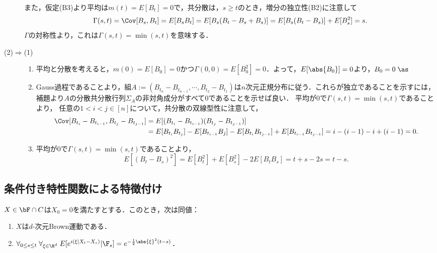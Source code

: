 \documentclass[uplatex,dvipdfmx]{jsreport}
\begin{document}
\begin{Proof}
\begin{description}
        また，仮定(B3)より平均は$m(t)=E[B_t]=0$で，共分散は，$s\ge t$のとき，増分の独立性(B2)に注意して
        \[\Gamma(s,t)=\Cov[B_s,B_t]=E[B_sB_t]=E[B_s(B_t-B_s+B_s)]=E[B_s(B_t-B_s)]+E[B_s^2]=s.\]
        $\Gamma$の対称性より，これは$\Gamma(s,t)=\min(s,t)$を意味する．
        \item[(2)$\Rightarrow$(1)]
        \begin{enumerate}[({B}1)]
            \item 平均と分散を考えると，$m(0)=E[B_0]=0$かつ$\Gamma(0,0)=E[B_0^2]=0$．よって，$E[\abs{B_0}]=0$より，$B_0=0\;\as$
            \item Gauss過程であることより，組$A:=(B_{t_n}-B_{t_{n-1}},\cdots,B_{t_2}-B_{t_1})$は$n$次元正規分布に従う．これらが独立であることを示すには，補題より$A$の分散共分散行列$\Sigma_A$の非対角成分がすべて$0$であることを示せば良い．
            平均が$0$で$\Gamma(s,t)=\min(s,t)$であることより，
            任意の$1<i< j\in[n]$について，共分散の双線型性に注意して，
            \begin{align*}
                \Cov[B_{t_i}-B_{t_{i-1}},B_{t_j}-B_{t_{j-1}}]&=E[(B_{t_i}-B_{t_{i-1}})(B_{t_j}-B_{t_{j-1}})]\\
                &=E[B_{t_i}B_{t_j}]-E[B_{t_{i-1}}B_j]-E[B_{t_i}B_{t_{j-1}}]+E[B_{t_{i-1}}B_{t_{j-1}}]=i-(i-1)-i+(i-1)=0.
            \end{align*}
            \item 平均が$0$で$\Gamma(s,t)=\min(s,t)$であることより，
            \[E[(B_t-B_s)^2]=E[B_t^2]+E[B_s^2]-2E[B_tB_s]=t+s-2s=t-s.\]
        \end{enumerate}
    \end{description}
\end{Proof}

\subsection{条件付き特性関数による特徴付け}

\begin{proposition}
    $X\in\bF\cap C$は$X_0=0$を満たすとする．このとき，次は同値：
    \begin{enumerate}
        \item $X$は$d$-次元Brown運動である．
        \item $\forall_{0\le s\le t}\;\forall_{\xi\in\R^d}\;E[e^{i(\xi|X_t-X_s)}|\F_s]=e^{-\frac{1}{2}\abs{\xi}^2(t-s)}$．
    \end{enumerate}
\end{proposition}
\end{document}

